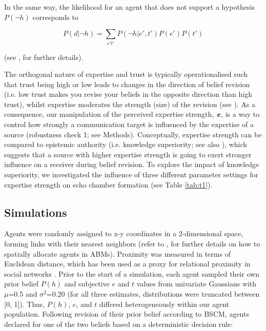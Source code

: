 \documentclass[fleqn,10pt]{wlscirep}
\begin{document}
In the same way, the likelihood for an agent that does not support a hypothesis \(P(\neg h)\) corresponds to
   
\begin{equation}
    P(d|\neg h) = \sum_{e't'}P(\neg h|e',t')P(e')P(t') 
\end{equation}

(see \cite{hahn2009argument, harris2016appeal}, for further details).  

The orthogonal nature of expertise and trust is typically operationalised such that trust being high or low leads to changes in the direction of belief revision (i.e. low trust makes you revise your beliefs in the opposite direction than high trust), whilst expertise moderates the strength (size) of the revision (see  \cite{bovens2003bayesian, harris2016appeal}). As a consequence, our manipulation of the perceived expertise strength, \(\textbf{\emph{e}}\), is a way to control how strongly a communication target is influenced by the expertise of a source (robustness check 1; see Methods). Conceptually, expertise strength can be compared to epistemic authority (i.e. knowledge superiority; see also \cite{walton2010appeal}), which suggests that a source with higher expertise strength is going to exert stronger influence on a receiver during belief revision.  
To explore the impact of knowledge superiority, we investigated the influence of three different parameter settings for expertise strength on echo chamber formation (see Table \ref{tab:t1}). 


\subsection*{Simulations}
Agents were randomly assigned to x-y coordinates in a 2-dimensional space, forming links with their nearest neighbors (refer to \cite{wilensky2015introduction}, for further details on how to spatially allocate agents in ABMs). Proximity was measured in terms of Euclidean distance, which has been used as a proxy for relational proximity in social networks \cite{duggins2017}. Prior to the start of a simulation, each agent sampled their own prior belief \(P(h)\) and subjective \(e\) and \(t\) values from univariate Gaussians with \(\mu\)=0.5 and \(\sigma^2\)=0.20 (for all three estimates, distributions were truncated between [0, 1]). Thus, \(P(h)\), \(e\), and \(t\) differed heterogeneously within our agent population. Following revision of their prior belief according to BSCM, agents declared for one of the two beliefs based on a deterministic decision rule: 
\end{document}

